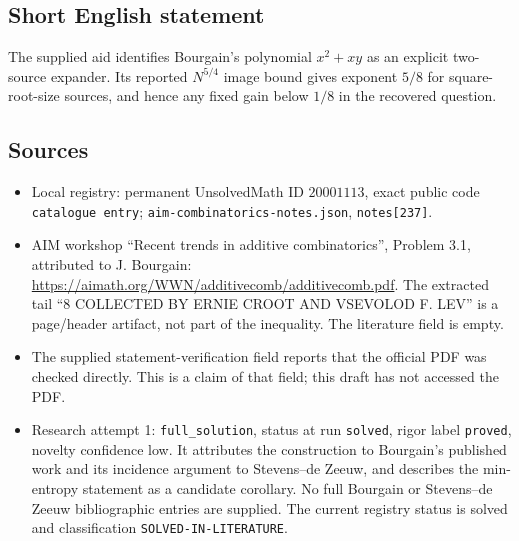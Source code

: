 \documentclass[11pt]{article}
\begin{document}
\subsection{Short English statement}
The supplied aid identifies Bourgain's polynomial \(x^2+xy\) as an explicit two-source expander. Its reported \(N^{5/4}\) image bound gives exponent \(5/8\) for square-root-size sources, and hence any fixed gain below \(1/8\) in the recovered question.
\subsection{Sources}
\begin{itemize}
\item Local registry: permanent UnsolvedMath ID \(20001113\), exact public code \texttt{catalogue entry}; \texttt{aim-combinatorics-notes.json}, \texttt{notes[237]}.
\item AIM workshop ``Recent trends in additive combinatorics'', Problem 3.1, attributed to J. Bourgain: \url{https://aimath.org/WWN/additivecomb/additivecomb.pdf}. The extracted tail ``8 COLLECTED BY ERNIE CROOT AND VSEVOLOD F. LEV'' is a page/header artifact, not part of the inequality. The literature field is empty.
\item The supplied statement-verification field reports that the official PDF was checked directly. This is a claim of that field; this draft has not accessed the PDF.
\item Research attempt 1: \texttt{full\_solution}, status at run \texttt{solved}, rigor label \texttt{proved}, novelty confidence low. It attributes the construction to Bourgain's published work and its incidence argument to Stevens--de Zeeuw, and describes the min-entropy statement as a candidate corollary. No full Bourgain or Stevens--de Zeeuw bibliographic entries are supplied. The current registry status is solved and classification \texttt{SOLVED-IN-LITERATURE}.
\end{itemize}
\end{document}
